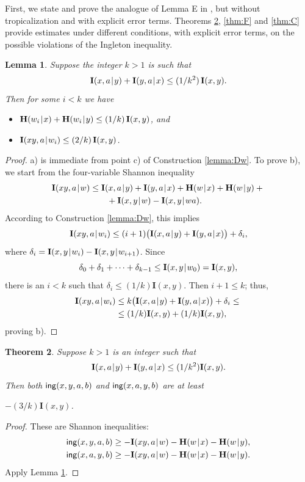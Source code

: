 \documentclass[10pt,a4paper]{amsart}
\def\|{\mskip1.5mu{|}\mskip1.5mu}
\def\H{\mathbf H}
\def\I{\mathbf I}
\def\ing[#1,#2,#3,#4]{\mathsf{ing}(#1,#2,#3,#4\mkern 0mu)}
\newtheorem{theorem}{Theorem}
\newtheorem{lemma}[theorem]{Lemma}
\begin{document}
First, we state and prove the analogue of Lemma E in \cite{rom3}, but
without tropicalization and with explicit error terms. Theorems
\ref{thm:AB}, \ref{thm:F} and \ref{thm:C} provide estimates under different
conditions, with explicit error terms, on the possible violations of the
Ingleton inequality.

\begin{lemma}\label{corr:E}
Suppose the integer $k>1$ is such that
$$
  \I(x,a\|y)+\I(y,a\|x)\le (1/k^2)\,\I(x,y).
$$
Then for some $i<k$ we have
\begin{itemize}
\item[a)] $\H(w_i\|x)+\H(w_i\|y) \le (1/k)\,\I(x,y)$, and
\item[b)] $\I(xy,a\|w_i)\le (2/k)\,\I(x,y)$.
\end{itemize}
\end{lemma}
\begin{proof}
a) is immediate from point c) of Construction \ref{lemma:Dw}. To prove b), we start
from the four-variable Shannon inequality
\begin{align*}
  \I(xy,a\|w) &\le \I(x,a\|y)+\I(y,a\|x)+\H(w\|x)+\H(w\|y) + {}\\
              & ~~~~~~{} + \I(x,y\|w)-\I(x,y\|wa).
\end{align*}
According to Construction \ref{lemma:Dw}, this implies
$$
   \I(xy,a\|w_i)\le (i+1)\big(\I(x,a\|y)+\I(y,a\|x)\big ) +
   \delta_i,
$$
where $\delta_i=\I(x,y\|w_i)-\I(x,y\|w_{i+1})$. Since
$$
    \delta_0+\delta_1+\cdots+\delta_{k-1}\le 
    \I(x,y\|w_0)=\I(x,y),
$$
there is an $i< k$ such that $\delta_i\le (1/k)\I(x,y)$. Then $i+1\le
k$; thus,
\begin{align*}
  \I(xy,a\|w_i) &\le k\big(\I(x,a\|y)+\I(y,a\|x)\big ) +
        \delta_i \le{} \\
   &\le (1/k)\I(x,y) + (1/k)\I(x,y),
\end{align*}
proving b).
\end{proof}


\begin{theorem}\label{thm:AB}
Suppose $k>1$ is an integer such that
$$
   \I(x,a\|y)+\I(y,a\|x) \le (1/k^2)\I(x,y).
$$
Then both $\ing[x,y,a,b]$ and $\ing[x,a,y,b]$ are at least

$-(3/k)\I(x,y)$.
\end{theorem}

\begin{proof}
These are Shannon inequalities:
\begin{align*}
   \ing[x,y,a,b] &\ge -\I(xy,a\|w)-\H(w\|x)-\H(w\|y), \\
   \ing[x,a,y,b] &\ge -\I(xy,a\|w)-\H(w\|x)-\H(w\|y).
\end{align*}
Apply Lemma \ref{corr:E}.
\end{proof}
\end{document}
